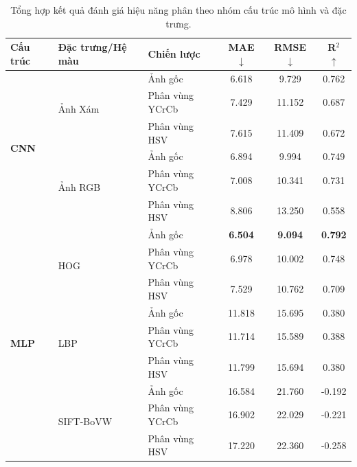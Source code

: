 \begin{table}[H]
    \centering
    \footnotesize
    \renewcommand{\arraystretch}{1.15}
    \caption{Tổng hợp kết quả đánh giá hiệu năng phân theo nhóm cấu trúc mô hình và đặc trưng.}
    \label{tab:all-models-grouped}
    \begin{tabular}{lllccc}
        \toprule
        \textbf{Cấu trúc} & \textbf{Đặc trưng/Hệ màu} & \textbf{Chiến lược} & \textbf{MAE $\downarrow$} & \textbf{RMSE $\downarrow$} & \textbf{R$^2$ $\uparrow$} \\
        \midrule
        \multirow{6}{*}{\textbf{CNN}} 
        & \multirow{3}{*}{Ảnh Xám} 
        & Ảnh gốc & 6.618 & 9.729 & 0.762 \\
        & & Phân vùng YCrCb & 7.429 & 11.152 & 0.687 \\
        & & Phân vùng HSV & 7.615 & 11.409 & 0.672 \\
        \cmidrule{2-6}
        & \multirow{3}{*}{Ảnh RGB} 
        & Ảnh gốc & 6.894 & 9.994 & 0.749 \\
        & & Phân vùng YCrCb & 7.008 & 10.341 & 0.731 \\
        & & Phân vùng HSV & 8.806 & 13.250 & 0.558 \\
        \midrule
        
        \multirow{9}{*}{\textbf{MLP}} 
        & \multirow{3}{*}{HOG} 
        & Ảnh gốc & \textbf{6.504} & \textbf{9.094} & \textbf{0.792} \\
        & & Phân vùng YCrCb & 6.978 & 10.002 & 0.748 \\
        & & Phân vùng HSV & 7.529 & 10.762 & 0.709 \\
        \cmidrule{2-6}
        & \multirow{3}{*}{LBP} 
        & Ảnh gốc & 11.818 & 15.695 & 0.380 \\
        & & Phân vùng YCrCb & 11.714 & 15.589 & 0.388 \\
        & & Phân vùng HSV & 11.799 & 15.694 & 0.380 \\
        \cmidrule{2-6}
        & \multirow{3}{*}{SIFT-BoVW} 
        & Ảnh gốc & 16.584 & 21.760 & -0.192 \\
        & & Phân vùng YCrCb & 16.902 & 22.029 & -0.221 \\
        & & Phân vùng HSV & 17.220 & 22.360 & -0.258 \\
        \midrule
        

\end{tabular}
\end{table}
